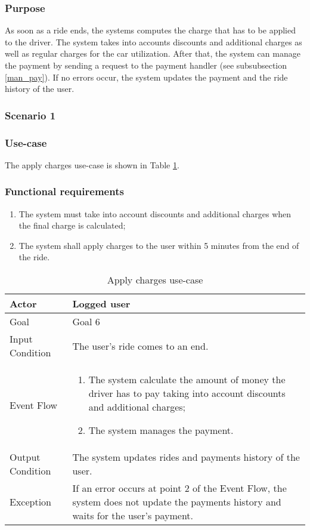 \subsubsection{Purpose}
As soon as a ride ends, the systems computes the charge that has to be applied to the driver. The system takes into accounts discounts and additional charges as well as regular charges for the car utilization. After that, the system can manage the payment by sending a request to the payment handler (see subsubsection \ref{man_pay}). If no errors occur, the system updates the payment and the ride history of the user.

\subsubsection{Scenario 1}

\subsubsection{Use-case}
The apply charges use-case is shown in Table \ref{apply_charges_uc}.

\subsubsection{Functional requirements}
\begin{enumerate}
\item The system must take into account discounts and additional charges when the final charge is calculated;
\item The system shall apply charges to the user within 5 minutes from the end of the ride.
\end{enumerate}

\begin{table}[H]
\begin{center}
\begin{tabular}{p{} | p{}}
\hline
Actor & Logged user\\
\hline
Goal & Goal 6\\
\hline
Input Condition & The user's ride comes to an end.\\
\hline
Event Flow & 
\begin{enumerate}
\item The system calculate the amount of money the driver has to pay taking into account discounts and additional charges;
\item The system manages the payment.
\end{enumerate} \\
\hline
Output Condition & The system updates rides and payments history of the user.\\
\hline
Exception & If an error occurs at point 2 of the Event Flow, the system does not update the payments history and waits for the user's payment.\\
\hline
\end{tabular}
\end{center}
\caption{Apply charges use-case}
\label{apply_charges_uc}
\end{table}